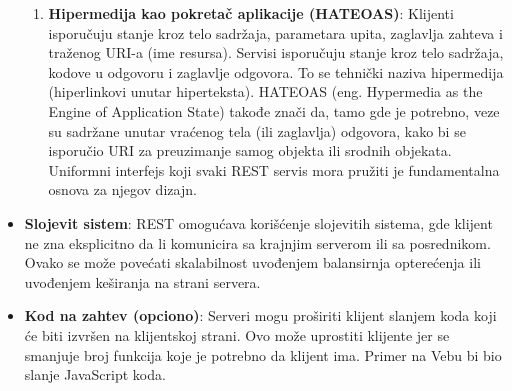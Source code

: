 \begin{itemize}
\begin{enumerate}
        \item \textbf{Hipermedija kao pokretač aplikacije (HATEOAS)}: Klijenti isporučuju stanje kroz telo sadržaja,
        parametara upita, zaglavlja zahteva i traženog URI-a (ime resursa). Servisi isporučuju stanje 
        kroz telo sadržaja, kodove u odgovoru i zaglavlje odgovora. To se tehnički naziva hipermedija 
        (hiperlinkovi unutar hiperteksta). HATEOAS (eng. Hypermedia as the Engine of Application State) 
        takođe znači da, tamo gde je potrebno, veze su sadržane unutar vraćenog tela 
        (ili zaglavlja) odgovora, kako bi se isporučio URI za preuzimanje samog objekta ili srodnih 
        objekata. Uniformni interfejs koji svaki REST servis mora pružiti je fundamentalna 
        osnova za njegov dizajn.
        
        
    \end{enumerate}
    
	\item \textbf{Slojevit sistem}: REST omogućava korišćenje slojevitih sistema, gde klijent ne zna 
    eksplicitno da li komunicira sa krajnjim serverom ili sa posrednikom. Ovako se može povećati 
    skalabilnost uvođenjem balansirnja opterećenja ili uvođenjem keširanja na strani servera. 
	
	\item \textbf{Kod na zahtev (opciono)}: Serveri mogu proširiti klijent slanjem koda koji će biti izvršen na 
	klijentskoj strani. Ovo može uprostiti klijente jer se smanjuje broj funkcija koje je potrebno da 
    klijent ima. Primer na Vebu bi bio slanje JavaScript koda. 

\end{itemize}



